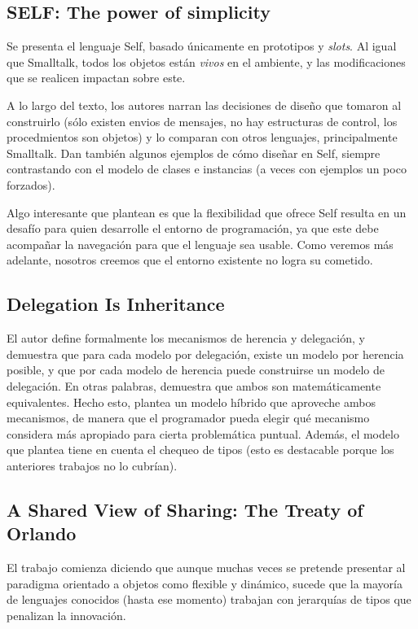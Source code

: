 \documentclass[a4paper,10pt]{article}
\begin{document}
\subsection{SELF: The power of simplicity}
Se presenta el lenguaje Self, basado únicamente en prototipos y \textit{slots}. Al igual que Smalltalk, todos los objetos están \textit{vivos} en el ambiente, y las modificaciones que se realicen impactan sobre este.

A lo largo del texto, los autores narran las decisiones de diseño que tomaron al construirlo (sólo existen envios de mensajes, no hay estructuras de control, los procedmientos son objetos) y lo comparan con otros lenguajes, principalmente Smalltalk. Dan también algunos ejemplos de cómo diseñar en Self, siempre contrastando con el modelo de clases e instancias (a veces con ejemplos un poco forzados).

Algo interesante que plantean es que la flexibilidad que ofrece Self resulta en un desafío para quien desarrolle el entorno de programación, ya que este debe acompañar la navegación para que el lenguaje sea usable. Como veremos más adelante, nosotros creemos que el entorno existente no logra su cometido.

\subsection{Delegation Is Inheritance}

El autor define formalmente los mecanismos de herencia y delegación, y demuestra que para cada modelo por delegación, existe un modelo por herencia posible, y que por cada modelo de herencia puede construirse un modelo de delegación. En otras palabras, demuestra que ambos son matemáticamente equivalentes. Hecho esto, plantea un modelo híbrido que aproveche ambos mecanismos, de manera que el programador pueda elegir qué mecanismo considera más apropiado para cierta problemática puntual. Además, el modelo que plantea tiene en cuenta el chequeo de tipos (esto es destacable porque los anteriores trabajos no lo cubrían).


\subsection{A Shared View of Sharing: The Treaty of Orlando}
El trabajo comienza diciendo que aunque muchas veces se pretende presentar al paradigma orientado a objetos como flexible y dinámico, sucede que la mayoría de lenguajes conocidos (hasta ese momento) trabajan con jerarquías de tipos que penalizan la innovación.
\end{document}
